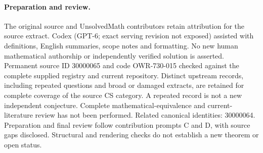 \documentclass[11pt]{article}
\begin{document}
\paragraph{Preparation and review.}
The original source and UnsolvedMath contributors retain attribution for the source extract. Codex (GPT-6; exact serving revision not exposed) assisted with definitions, English summaries, scope notes and formatting. No new human mathematical authorship or independently verified solution is asserted. Permanent source ID 30000065 and code OWR-730-015 checked against the complete supplied registry and current repository. Distinct upstream records, including repeated questions and broad or damaged extracts, are retained for complete coverage of the source CS category. A repeated record is not a new independent conjecture. Complete mathematical-equivalence and current-literature review has not been performed. Related canonical identities: 30000064. Preparation and final review follow contribution prompts C and D, with source gaps disclosed. Structural and rendering checks do not establish a new theorem or open status.
\label{end:30000065}
\end{document}
